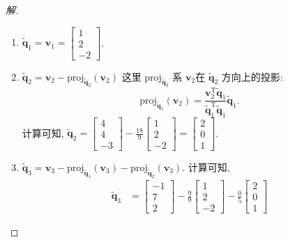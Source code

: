 \documentclass[UTF8]{ctexart}
\begin{document}
\begin{proof}[解]
  \begin{enumerate}
\item \(\widetilde{\boldsymbol{q}}_{1} = \boldsymbol{v}_{1}=\begin{bmatrix}1 \\ 2 \\-2\end{bmatrix}\).
\item \(\widetilde{\boldsymbol{q}}_{2} = \boldsymbol{v}_{2} - \mathrm{proj}_{\widetilde{\boldsymbol{q}}_{2}}(\boldsymbol{v}_{2})\)
这里 \(\mathrm{proj}_{\widetilde{\boldsymbol{q}}_{2}}\) 系 \(\boldsymbol{v}_{2}\)在 \(\widetilde{\boldsymbol{q}}_{2}\)
方向上的投影:
\begin{equation*}
  \mathrm{proj}_{\widetilde{\boldsymbol{q}}_1}(\boldsymbol{v}_2) =
  \frac{\boldsymbol{v}_2^{\mathrm{T}}\widetilde{\boldsymbol{q}}_1}{\widetilde{\boldsymbol{q}}_1^{\mathrm{T}}\widetilde{\boldsymbol{q}}_1}\widetilde{\boldsymbol{q}}_1.
\end{equation*}
计算可知, \(\widetilde{\boldsymbol{q}}_{2} = \begin{bmatrix}4\\4\\-3\end{bmatrix}-\frac{18}{9}\begin{bmatrix}1\\2\\-2\end{bmatrix}=\begin{bmatrix}2\\0\\1\end{bmatrix}\).
\item \(\widetilde{\boldsymbol{q}}_{3} = \boldsymbol{v}_{3} -\mathrm{proj}_{\widetilde{\boldsymbol{q}}_{1}}(\boldsymbol{v}_{3}) - \mathrm{proj}_{\widetilde{\boldsymbol{q}}_{2}}(\boldsymbol{v}_{3})\).
计算可知,
\begin{align*}
  \widetilde{\boldsymbol{q}}_3 &=
  \begin{bmatrix}
    -1 \\ 7 \\ 2
  \end{bmatrix}
  -\frac{9}{9}
  \begin{bmatrix}
    1 \\ 2 \\ -2
  \end{bmatrix}
  -\frac{0}{5}
  \begin{bmatrix}
    2 \\ 0 \\ 1

\end{bmatrix}
\end{align*}
\end{enumerate}
\end{proof}
\end{document}
